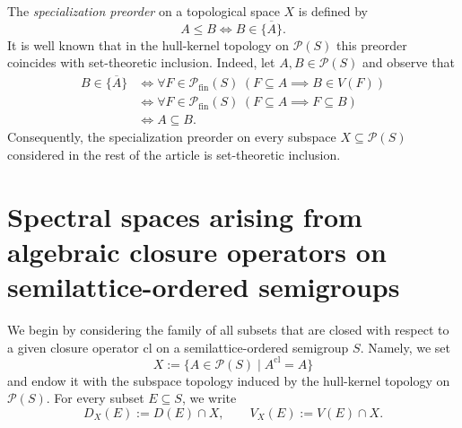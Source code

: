 \documentclass[10pt,a4paper]{amsart}
\begin{document}
The \emph{specialization preorder} on a topological space $X$ is defined by 
\begin{equation*}
    A \leqslant B \iff B \in \overline{\{A\}}. 
\end{equation*}
It is well known that in the hull-kernel topology on $\mathcal{P}(S)$ this preorder coincides with set-theoretic inclusion. Indeed, let $A, B \in \mathcal{P}(S)$ and observe that 
\begin{equation*}\begin{aligned}
    B \in \overline{\{A\}} &\iff \forall F\in\mathcal{P}_\mathrm{fin}(S) \hspace{3pt} (F \subseteq A \implies B \in V(F)) \\ &\iff \forall F\in\mathcal{P}_\mathrm{fin}(S) \hspace{3pt} (F \subseteq A \implies F \subseteq B) \\ &\iff A \subseteq B. 
\end{aligned}\end{equation*}
Consequently, the specialization preorder on every subspace $X \subseteq\mathcal{P}(S)$ considered in the rest of the article is set-theoretic inclusion. 
\section{Spectral spaces arising from algebraic closure operators on semilattice-ordered semigroups}\label{spectral_spaces_arising_from_closures}
We begin by considering the family of all subsets that are closed with respect to a given closure operator $\mathrm{cl}$ on a semilattice-ordered semigroup $S$. Namely, we set $$X := \{A\in\mathcal{P}(S) \mid A^\mathrm{cl} = A\}$$ and endow it with the subspace topology induced by the hull-kernel topology on $\mathcal{P}(S)$. For every subset $E \subseteq S$, we write $$D_X(E) := D(E) \cap X, \qquad V_X(E) := V(E) \cap X.$$
\end{document}
